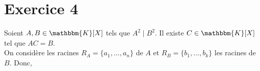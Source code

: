 \part{Exercice 4}

Soient $A,B\in \mathbbm{K}[X]$ tels que $A^2 \mid B^2$. Il existe $C \in \mathbbm{K}[X]$ tel que $AC = B$.\\

On considère les racines $R_A = \{a_1,\ldots, a_n\}$ de $A$ et $R_B = \{b_1, \ldots, b_k\}$ les racines de $B$. Donc, $$
